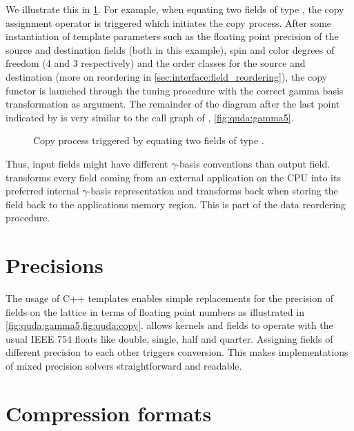 
We illustrate this in \cref{fig:quda:copy}.
For example, when equating two fields of type , the copy assignment operator is triggered which initiates the copy process.
After some instantiation of template parameters such as the floating point precision of the source  and destination  fields (both  in this example), spin and color degrees of freedom (\num{4} and \num{3} respectively) and the order classes for the source and destination (more on reordering in \cref{sec:interface:field_reordering}), the copy functor  is launched through the tuning procedure with the correct gamma basis transformation as argument.
The remainder of the diagram after the last point indicated by  is very similar to the call graph of , \cref{fig:quda:gamma5}.
\begin{figure}
  
  \caption{Copy process triggered by equating two fields of type .}
  \label{fig:quda:copy}
\end{figure}

Thus, input fields might have different $\gamma$-basis conventions than output field.
\Quda transforms every field coming from an external application on the CPU into its preferred internal $\gamma$-basis representation and transforms back when storing the field back to the applications memory region.
This is part of the data reordering procedure.

\section{Precisions}

The usage of C++ templates enables simple replacements for the precision of fields on the lattice in terms of floating point numbers as illustrated in \cref{fig:quda:gamma5,fig:quda:copy}. \Quda allows kernels and fields to operate with the usual IEEE 754 floats like double, single, half and quarter. Assigning fields of different precision to each other triggers conversion. This makes implementations of mixed precision solvers straightforward and readable.

\section{Compression formats}
\label{quda:compresed_formats}

